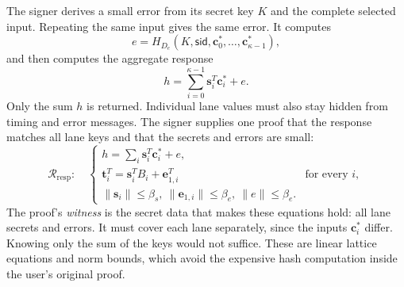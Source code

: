 \documentclass[10pt]{article}
\begin{document}
The signer derives a small error from its secret key $K$ and the complete
selected input.  Repeating the same input gives the same error.  It computes
\[
 e=H_{D_e}(K,\mathsf{sid},\mathbf c_0^*,\ldots,
                         \mathbf c_{\kappa-1}^*),
\]
and then computes the aggregate response
\[
 h=\sum_{i=0}^{\kappa-1}\mathbf s_i^T\mathbf c_i^*+e.
\]
Only the sum $h$ is returned.  Individual lane values must also stay hidden
from timing and error messages.  The signer supplies one proof that the
response matches all lane keys and that the secrets and errors are small:
\[
 \mathcal R_{\mathrm{resp}}:\quad
 \begin{cases}
  h=\sum_i\mathbf s_i^T\mathbf c_i^*+e,\\
  \mathbf t_i^T=\mathbf s_i^T B_i+\mathbf e_{1,i}^T
       &\text{for every }i,\\
  \|\mathbf s_i\|\leq\beta_s,
  \ \|\mathbf e_{1,i}\|\leq\beta_e,
  \ \|e\|\leq\beta_e.
 \end{cases}
\]
The proof's \emph{witness} is the secret data that makes these equations
hold: all lane secrets and errors.  It must cover each lane separately,
since the inputs $\mathbf c_i^*$ differ.  Knowing only the sum of the keys
would not suffice.  These are linear lattice equations and norm bounds,
which avoid the expensive hash computation inside the user's original proof.
\end{document}
